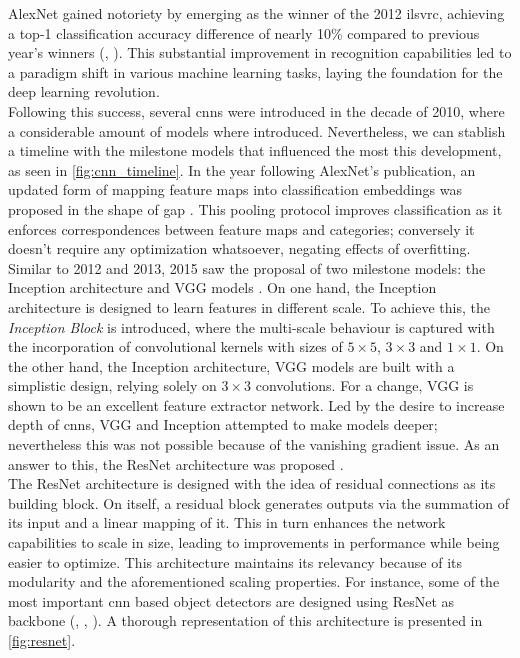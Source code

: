 AlexNet gained notoriety by emerging as the winner of the 2012 \gls{ilsvrc}, achieving a top-1 
classification accuracy difference of nearly 10\% compared to previous year's winners 
(\cite{berg2010large}, \cite{sanchez2011high}). This substantial improvement in recognition 
capabilities led to a paradigm shift in various machine learning tasks, laying the foundation 
for the deep learning revolution.\\

\noindent Following this success, several \glspl{cnn} were introduced in the decade of 2010, where 
a considerable amount of models where introduced. Nevertheless, we can stablish a timeline with the 
milestone models that influenced the most this development, as seen in \autoref{fig:cnn_timeline}.
In the year following AlexNet's publication, an updated form of mapping feature maps into 
classification embeddings was proposed  in the shape of \gls{gap} \autocite{lin2013network}. 
This pooling protocol improves classification as it enforces correspondences between feature maps 
and categories; conversely it doesn't require any optimization whatsoever, negating effects of 
overfitting.\\ 

\noindent Similar to 2012 and 2013, 2015 saw the proposal of two milestone models: the Inception 
architecture \autocite{szegedy2015going} and VGG models \autocite{simonyan2015deep}. On one hand, 
the Inception architecture is designed to learn features in different scale. To achieve this, the 
\emph{Inception Block} is introduced, where the multi-scale behaviour is captured with the 
incorporation of convolutional kernels with sizes of $5\times5$, $3\times 3$ and $1\times1$. On the 
other hand, the Inception architecture, VGG models are built with a simplistic design, relying 
solely on $3\times 3$ convolutions. For a change, VGG is shown to be an excellent feature extractor 
network. Led by the desire to increase depth of \glspl{cnn}, VGG and Inception attempted to make 
models deeper; nevertheless this was not possible because of the vanishing gradient issue. As an 
answer to this, the ResNet architecture was proposed \autocite{he2016deep}.\\



%
\noindent The ResNet architecture is designed with the idea of residual connections as its 
building block. On itself, a residual block generates outputs via the summation of its input and a 
linear mapping of it. This in turn enhances the network capabilities to scale in size, leading to 
improvements in performance while being easier to optimize. This architecture maintains its 
relevancy because of its modularity and the aforementioned scaling properties. For instance, some 
of the most important \gls{cnn} based object detectors are designed using ResNet as backbone 
(\cite{ren2015faster}, \cite{lin2017focal}, \cite{he2017mask}). A thorough representation of this 
architecture is presented in \autoref{fig:resnet}. \\

